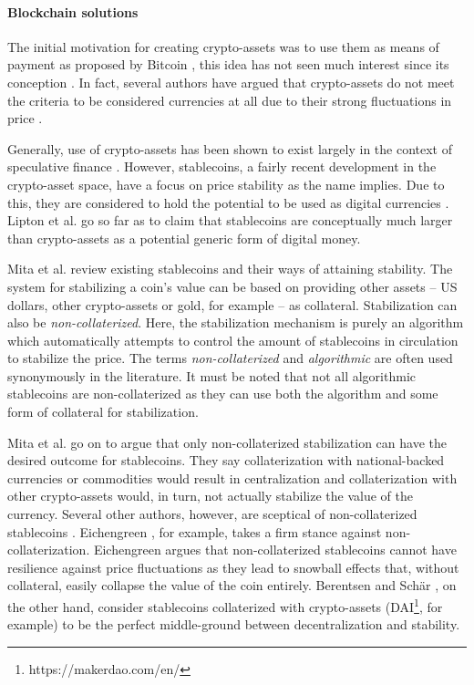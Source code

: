 \paragraph{Blockchain solutions} The initial motivation for
creating crypto-assets was to use them as means of payment as proposed
by Bitcoin \cite{nakamoto2008bitcoin}, this idea has not seen much
interest since its conception \cite{liptonTether}. In fact, several
authors have argued that crypto-assets do not meet the criteria to be
considered currencies at all due to their strong fluctuations in price
\cite{carstensMoney,merschVirtual,yermackBitcoin}. 

Generally, use of crypto-assets has been shown to exist largely in the
context of speculative finance \cite{liptonTether,steinmetzOwnership}.
However, stablecoins, a fairly recent development in the
crypto-asset space, have a focus on price stability
\cite{mitaStablecoin} as the name implies. Due to this, they are
considered to hold the potential to be used as digital currencies
\cite{bullmannSearch,liptonTether}. Lipton et al. go so far as to
claim that stablecoins are conceptually much larger than crypto-assets
as a potential generic form of digital money.

Mita et al. \cite{mitaStablecoin} review existing stablecoins and
their ways of attaining stability. The system for stabilizing a coin's
value can be based on providing other assets -- US dollars, other
crypto-assets or gold, for example -- as collateral. Stabilization
can also be \textit{non-collaterized}. Here, the stabilization
mechanism is purely an algorithm which automatically attempts to
control the amount of stablecoins in circulation to stabilize the
price. The terms \textit{non-collaterized} and \textit{algorithmic}
are often used synonymously in the literature. It must be noted that
not all algorithmic stablecoins are non-collaterized as they can use
both the algorithm and some form of collateral for stabilization.

Mita et al. go on to argue that only non-collaterized stabilization
can have the desired outcome for stablecoins. They say collaterization
with national-backed currencies or commodities would result in
centralization and collaterization with other crypto-assets would,
in turn, not actually stabilize the value of the currency. Several
other authors, however, are sceptical of non-collaterized stablecoins
\cite{berentsenStablecoins,bullmannSearch,eichengreenCommodity,lyonsStable}.
Eichengreen \cite{eichengreenCommodity}, for example, takes a firm
stance against non-collaterization. Eichengreen argues that
non-collaterized stablecoins cannot have resilience against price
fluctuations as they lead to snowball effects that, without
collateral, easily collapse the value of the coin entirely. Berentsen
and Schär \cite{berentsenStablecoins}, on the other hand, consider
stablecoins collaterized with crypto-assets
(DAI\footnote{https://makerdao.com/en/}, for example) to be the
perfect middle-ground between decentralization and stability.

